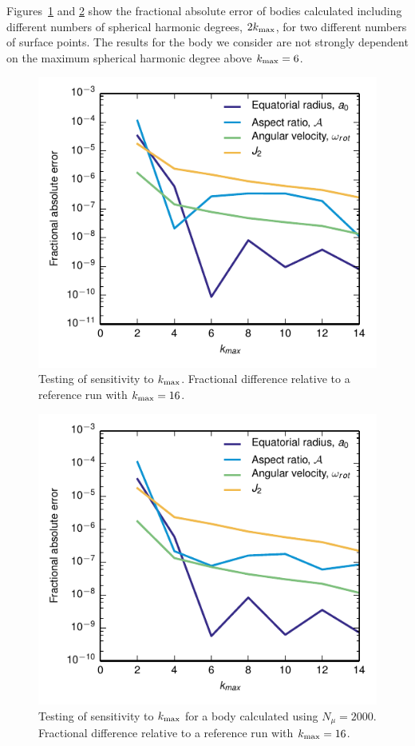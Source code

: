 \documentclass[11pt, oneside]{article}   	%
\begin{document}
Figures~\ref{HUG:fig:test_kmax} and \ref{HUG:fig:test_kmax1} show the fractional absolute error of bodies calculated including different numbers of spherical harmonic degrees, $2k_{\rm max}$, for two different numbers of surface points. The results for the body we consider are not strongly dependent on the maximum spherical harmonic degree above $k_{\rm max}=6$.


\begin{figure}[]
   \centering
   \includegraphics[]{Figures/Test_kmax.pdf} 
   \caption{Testing of sensitivity to $k_{\rm max}$. Fractional difference relative to a reference run with $k_{\rm max}=16$.}
   \label{HUG:fig:test_kmax}
\end{figure}

\begin{figure}[]
   \centering
   \includegraphics[]{Figures/Test_kmax_1.pdf} 
   \caption{Testing of sensitivity to $k_{\rm max}$ for a body calculated using $N_{\mu}=2000$. Fractional difference relative to a reference run with $k_{\rm max}=16$.}
   \label{HUG:fig:test_kmax1}
\end{figure}
\end{document}
